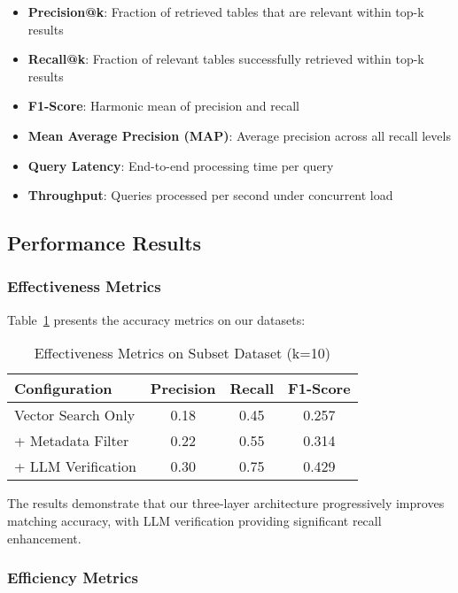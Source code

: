 \documentclass[conference]{IEEEtran}
\begin{document}
\begin{itemize}
    \item \textbf{Precision@k}: Fraction of retrieved tables that are relevant within top-k results
    \item \textbf{Recall@k}: Fraction of relevant tables successfully retrieved within top-k results
    \item \textbf{F1-Score}: Harmonic mean of precision and recall
    \item \textbf{Mean Average Precision (MAP)}: Average precision across all recall levels
    \item \textbf{Query Latency}: End-to-end processing time per query
    \item \textbf{Throughput}: Queries processed per second under concurrent load
\end{itemize}

\subsection{Performance Results}

\subsubsection{Effectiveness Metrics}

Table~\ref{tab:effectiveness} presents the accuracy metrics on our datasets:

\begin{table}[htbp]
\caption{Effectiveness Metrics on Subset Dataset (k=10)}
\label{tab:effectiveness}
\centering
\begin{tabular}{lccc}
\toprule
\textbf{Configuration} & \textbf{Precision} & \textbf{Recall} & \textbf{F1-Score} \\
\midrule
Vector Search Only & 0.18 & 0.45 & 0.257 \\
+ Metadata Filter & 0.22 & 0.55 & 0.314 \\
+ LLM Verification & 0.30 & 0.75 & 0.429 \\
\bottomrule
\end{tabular}
\end{table}

The results demonstrate that our three-layer architecture progressively improves matching accuracy, with LLM verification providing significant recall enhancement.

\subsubsection{Efficiency Metrics}
\end{document}
